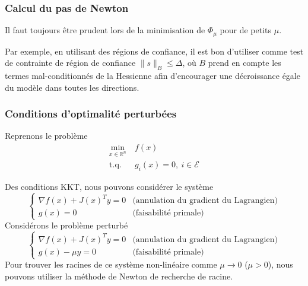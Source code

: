 \documentclass[t,usepdftitle=false]{beamer}
\def\cE{\mathcal{E}}
\def\RR{\mathbb{R}}
\begin{document}
\begin{frame}
\frametitle{Calcul du pas de Newton}

Il faut toujours être prudent lors de la minimisation de
$\Phi_{\mu}$ pour de petits $\mu$.

\mbox{}

Par exemple, en utilisant des régions de confiance, il est bon d'utiliser comme test de contrainte de région de confiance $\| s \|_B \leq \Delta$, où $B$ prend en compte les termes mal-conditionnés de la Hessienne afin d'encourager une décroissance égale du modèle dans toutes les directions.

\end{frame}

\begin{frame}
\frametitle{Conditions d'optimalité perturbées}

Reprenons le problème
\begin{align*}
\min_{x \in \RR^n}\ & f(x) \\
\mbox{t.q. } &g_i(x) = 0,\ i \in \cE
\end{align*}

Des conditions KKT, nous pouvons considérer le système
$$
\begin{cases}
\nabla f(x) + J(x)^Ty = 0 & \mbox{(annulation du gradient du Lagrangien)} \\
g(x) = 0 & \mbox{(faisabilité primale)}
\end{cases}
$$
Considérons le problème perturbé
$$
\begin{cases}
\nabla f(x) + J(x)^Ty = 0 & \mbox{(annulation du gradient du Lagrangien)} \\
g(x) - \mu y = 0 & \mbox{(faisabilité primale)}
\end{cases}
$$
Pour trouver les racines de ce système non-linéaire comme $\mu \rightarrow 0$ ($\mu > 0$), nous pouvons utiliser la méthode de Newton de recherche de racine.

\end{frame}
\end{document}
